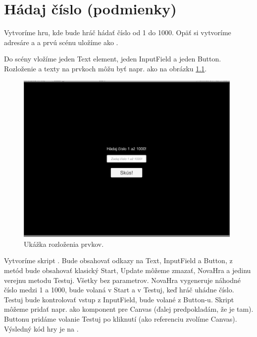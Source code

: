 \chapter{Hádaj číslo (podmienky)}

Vytvoríme hru, kde bude hráč hádať číslo od 1 do 1000. Opäť si vytvoríme adresáre  a  a prvú scénu uložíme ako .

Do scény vložíme jeden Text element, jeden InputField a jeden Button. Rozloženie a texty na prvkoch môžu byť napr. ako na obrázku \ref*{fig:plocha_hry_hadaj_cislo}.

\begin{figure}[h]
	\centering
	\includegraphics[width=0.98\textwidth]{./graphics/hadaj_cislo/plocha_hry.png}
	\caption{Ukážka rozloženia prvkov.\label{fig:plocha_hry_hadaj_cislo}}
\end{figure}

Vytvoríme skript . Bude obsahovať odkazy na Text, InputField a Button, z metód bude obsahovať klasický Start, Update môžeme zmazať, NovaHra a jedinu verejnu metodu Testuj. Všetky bez parametrov. NovaHra vygeneruje náhodné číslo medzi 1 a 1000, bude volaná v Start a v Testuj, keď hráč uhádne číslo. Testuj bude kontrolovať vstup z InputField, bude volané z Button-u. Skript môžeme pridať napr. ako komponent pre Canvas (ďalej predpokladám, že je tam). Buttonu pridáme volanie Testuj po kliknutí (ako referenciu zvolíme Canvas). Výsledný kód hry je na .

